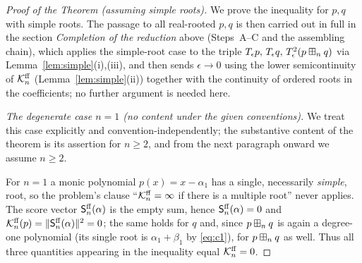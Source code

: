 \begin{proof}[Proof of the Theorem (assuming simple roots)]
We prove the inequality for $p,q$ with simple roots. The passage to all
real-rooted $p,q$ is then carried out in full in the section \emph{Completion of
the reduction} above (Steps~A--C and the assembling chain), which applies the
simple-root case to the triple $T_\epsilon p,\,T_\epsilon q,\,T_\epsilon^2(p\boxplus_n q)$
via Lemma~\ref{lem:simple}(i),(iii), and then sends $\epsilon\to0$ using the lower
semicontinuity of $\mathcal{K}^{\mathrm{ff}}_n$ (Lemma~\ref{lem:simple}(ii)) together with the
continuity of ordered roots in the coefficients; no further argument is needed
here.

\smallskip\noindent\textit{The degenerate case $n=1$ (no content under the given
conventions).} We treat this case explicitly and convention-independently; the
substantive content of the theorem is its assertion for $n\ge2$, and from the next
paragraph onward we assume $n\ge2$.

For $n=1$ a monic polynomial $p(x)=x-\alpha_1$ has a single, necessarily
\emph{simple}, root, so the problem's clause ``$\mathcal{K}^{\mathrm{ff}}_n=\infty$ if there is a
multiple root'' never applies. The score vector $\mathsf{S}^{\mathrm{ff}}_n(\alpha)$ is the empty
sum, hence $\mathsf{S}^{\mathrm{ff}}_n(\alpha)=0$ and $\mathcal{K}^{\mathrm{ff}}_n(p)=\|\mathsf{S}^{\mathrm{ff}}_n(\alpha)\|^2=0$;
the same holds for $q$ and, since $p\boxplus_n q$ is again a degree-one polynomial
(its single root is $\alpha_1+\beta_1$ by \eqref{eq:c1}), for $p\boxplus_n q$ as well.
Thus all three quantities appearing in the inequality equal $\mathcal{K}^{\mathrm{ff}}_n=0$.


\end{proof}
